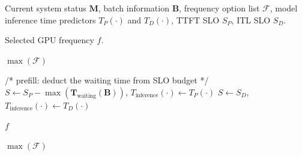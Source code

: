 \begin{algorithm}[!t]
\caption{\governor: SLO-Aware Frequency Selection}
 \label{alg:ecofreq}
 \begin{algorithmic}[1]

    \Require Current system status $\mathbf{M}$, batch information $\mathbf{B}$, frequency option list $\mathcal{F}$, model inference time predictors $T_P(\cdot)$ and $T_D(\cdot)$, TTFT SLO $S_P$, ITL SLO $S_D$.
    
    \Ensure Selected GPU frequency $f$.

       \label{algline:step1-beg}
        \State \Return $\max(\mathcal{F})$ 
    \EndIf \label{algline:step1-end}

      \label{algline:step2-beg}
        \Statex /* prefill: deduct the waiting time from SLO budget */
        \State $S \gets S_P - \max( \mathbf{T}_{\text{waiting}}(\mathbf{B}) )$, $T_{\text{inference}}(\cdot) \gets T_P(\cdot)$ 
    \Else
        \State $S \gets S_D$, $T_{\text{inference}}(\cdot) \gets T_D(\cdot)$ 
    \EndIf \label{algline:step2-end}


    

       \label{algline:step3-beg}
            \State \Return $f$ 
        \EndIf
    \EndFor

    \State \Return $\max(\mathcal{F})$   \label{algline:step3-end}

 \end{algorithmic}
\end{algorithm}


